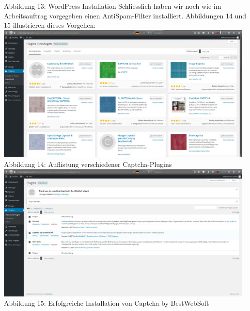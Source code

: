 \documentclass{article}
\begin{document}
	Abbildung 13: WordPress Installation
	\newline
	\newline
	Schliesslich haben wir noch wie im Arbeitsauftrag vorgegeben einen AntiSpam-Filter installiert. Abbildungen 14 und 15 illustrieren dieses Vorgehen:
	\newline
	\newline
	\includegraphics[width=13cm]{../Pics/40-wordpress-captcha}
	Abbildung 14: Auflistung verschiedener Captcha-Plugins
	\newline
	\newline
	\includegraphics[width=13cm]{../Pics/41-wordpress-captcha_installed}
	Abbildung 15: Erfolgreiche Installation von Captcha by BestWebSoft
	\newline
	\newline
\end{document}
